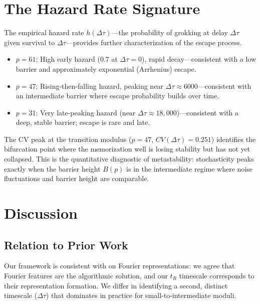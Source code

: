 \documentclass[11pt,twocolumn]{article}
\begin{document}
\section{The Hazard Rate Signature}
\label{sec:hazard}

The empirical hazard rate $h(\Delta\tau)$---the probability of grokking at delay $\Delta\tau$ given survival to $\Delta\tau$---provides further characterization of the escape process.

\begin{itemize}[itemsep=2pt]
\item \textbf{$p=61$}: High early hazard (0.7 at $\Delta\tau=0$), rapid decay---consistent with a low barrier and approximately exponential (Arrhenius) escape.
\item \textbf{$p=47$}: Rising-then-falling hazard, peaking near $\Delta\tau \approx 6000$---consistent with an intermediate barrier where escape probability builds over time.
\item \textbf{$p=31$}: Very late-peaking hazard (near $\Delta\tau \approx 18{,}000$)---consistent with a deep, stable barrier; escape is rare and late.
\end{itemize}

The CV peak at the transition modulus ($p=47$, $CV(\Delta\tau) = 0.251$) identifies the bifurcation point where the memorization well is losing stability but has not yet collapsed. This is the quantitative diagnostic of metastability: stochasticity peaks exactly when the barrier height $B(p)$ is in the intermediate regime where noise fluctuations and barrier height are comparable.

\section{Discussion}
\label{sec:discussion}

\subsection{Relation to Prior Work}

Our framework is consistent with \citet{nanda2023progress} on Fourier representations: we agree that Fourier features are the algorithmic solution, and our $t_R$ timescale corresponds to their representation formation. We differ in identifying a second, distinct timescale ($\Delta\tau$) that dominates in practice for small-to-intermediate moduli.
\end{document}
